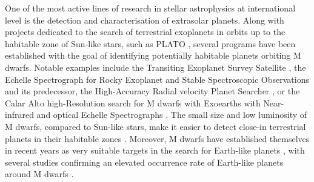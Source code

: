 One of the most active lines of research in stellar astrophysics at international level is the detection and characterisation of extrasolar planets. Along with projects dedicated to the search of terrestrial exoplanets in orbits up to the habitable zone of Sun-like stars, such as PLATO \citep{plato}, several programs have been established with the goal of identifying potentially habitable planets orbiting M dwarfs. Notable examples include the Transiting Exoplanet Survey Satellite \citep[TESS,][]{tess}, the Echelle Spectrograph for Rocky Exoplanet and Stable Spectroscopic Observations \citep[ESPRESSO,][]{pepe21} and its predecessor, the High-Accuracy Radial velocity Planet Searcher \citep[HARPS,][]{mayor2003,bonfils13}, or the Calar Alto high-Resolution search for M dwarfs with Exoearths with Near-infrared and optical Echelle Spectrographs \citep[CARMENES,][]{Quirrenbach16,Quirrenbach20}. The small size and low luminosity of M dwarfs, compared to Sun-like stars, make it easier to detect close-in terrestrial planets in their habitable zones \citep{zechmeister2019,Kossakowski2023,suarez2023,dreizler2024}. Moreover, M dwarfs have established themselves in recent years as very suitable targets in the search for Earth-like planets \citep{dressing2015,kopparapu2017,gillon2017,reiners2018,sabotta2021,nagel2023}, with  several studies confirming an elevated occurrence rate of Earth-like planets around M dwarfs \citep{gaidos2016,mulders2021,sabotta2021}.

